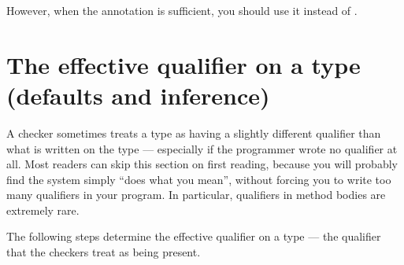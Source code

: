 However, when the  annotation is sufficient, you
should use it instead of .



\section{The effective qualifier on a type (defaults and inference)\label{effective-qualifier}}

A checker sometimes treats a type as having a slightly different qualifier
than what is written on the type --- especially if the programmer wrote no
qualifier at all.
Most readers can skip this section on first reading, because you will
probably find the system simply ``does what you mean'', without forcing
you to write too many qualifiers in your program.
In particular, qualifiers in method bodies are extremely rare.

  The following steps determine the effective
qualifier on a type --- the qualifier that the checkers treat as being present.

